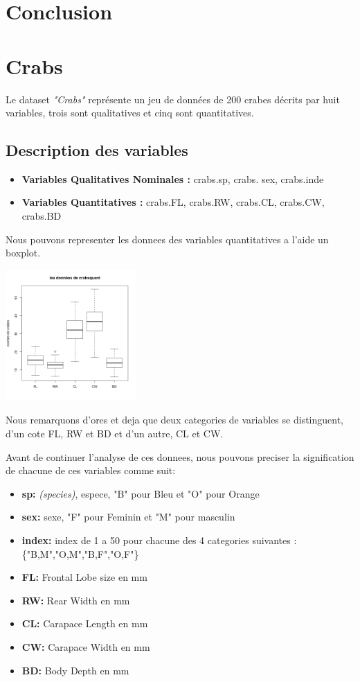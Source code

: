 \documentclass[]{report}
\begin{document}
\section{Conclusion}

\section{Crabs}
Le dataset \textit{"Crabs"} représente un jeu de données de 200 crabes décrits par huit variables, trois sont qualitatives et cinq sont quantitatives.

\subsection{Description des variables}


\begin{itemize}
	\item \textbf{Variables Qualitatives Nominales :}  crabs.sp, crabs. sex, crabs.inde
	\item \textbf{Variables Quantitatives : } crabs.FL, crabs.RW, crabs.CL, crabs.CW, crabs.BD
\end{itemize}

Nous pouvons representer les donnees des variables quantitatives a l'aide un boxplot.
\begin{center}
	\includegraphics[width=50mm]{Figures/Crabs/bxp_crabsquant.png}
	\label{fig:boxplot_crabs_quantitatives}
\end{center}

Nous remarquons d'ores et deja que deux categories de variables se distinguent, d'un cote FL, RW et BD et d'un autre, CL et CW.

Avant de continuer l'analyse de ces donnees, nous pouvons preciser la signification de chacune de ces variables comme suit:
\begin{itemize}
	\item \textbf{sp:} \textit{(species)}, espece, "B" pour Bleu et "O" pour Orange
	\item \textbf{sex:} sexe, "F" pour Feminin et "M" pour masculin
	\item \textbf{index:} index de 1 a 50 pour chacune des 4 categories suivantes : \{"B,M","O,M","B,F","O,F"\}
	\item \textbf{FL:} Frontal Lobe size en mm
	\item \textbf{RW:} Rear Width en mm
	\item \textbf{CL:} Carapace Length en mm
	\item \textbf{CW:} Carapace Width en mm 
	\item \textbf{BD:} Body Depth en mm
\end{itemize}
\end{document}
